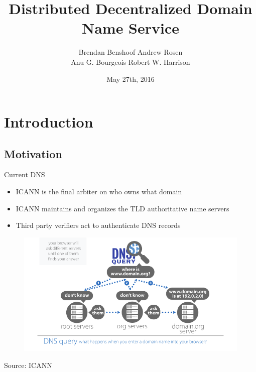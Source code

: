 \documentclass[11pt]{beamer}
\title[D$^3$NS]{Distributed Decentralized Domain Name Service}
\author{
Brendan Benshoof \qquad Andrew Rosen \\ \qquad Anu G. Bourgeois \qquad Robert W. Harrison }
\institute{Georgia State University}
\date{May 27th, 2016}
\begin{document}
	
\maketitle

\section{Introduction}
\subsection{Motivation}

\begin{frame}{Current DNS}
	\begin{itemize}
		\item ICANN is the final arbiter on who owns what domain
		\item ICANN maintains and organizes the TLD authoritative name servers
		\item Third party verifiers act to authenticate DNS records 
	\end{itemize}
	
	\begin{figure}
		\centering
		\includegraphics[width=0.6\linewidth]{figs/dns}
		\label{fig:dns}
	\end{figure}
	\begin{center}
		\footnotesize{Source: ICANN}
		
	\end{center}
	
\end{frame}
\end{document}
